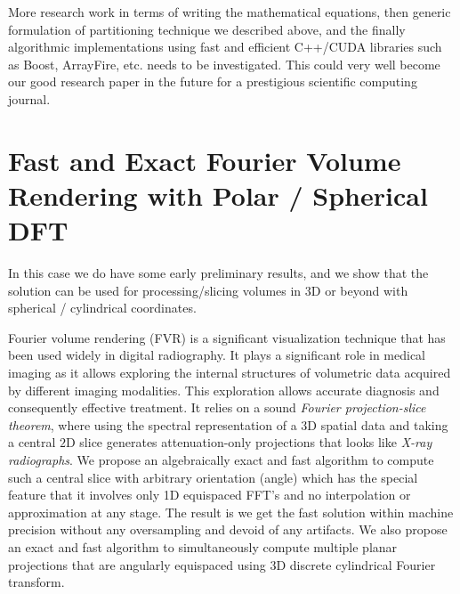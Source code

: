 \documentclass{UCF_ETD}
\begin{document}
More research work in terms of writing the mathematical equations, then generic formulation of partitioning technique we described above, and the finally algorithmic implementations using fast and efficient C++/CUDA libraries such as Boost, ArrayFire, etc. needs to be investigated. This could very well become our good research paper in the future for a prestigious scientific computing journal.

\section{Fast and Exact Fourier Volume Rendering with Polar / Spherical DFT}
In this case we do have some early preliminary results, and we show that the solution can be used for processing/slicing volumes in $3$D or beyond with spherical / cylindrical coordinates. 

Fourier volume rendering (FVR) is a significant visualization technique that has been used widely in digital radiography. It plays a significant role in medical imaging as it allows exploring the internal structures of volumetric data acquired by different imaging modalities. This exploration allows accurate diagnosis and consequently effective treatment. It relies on a sound \emph{Fourier projection-slice theorem}, where using the spectral representation of a $3$D spatial data and taking a central $2$D slice generates attenuation-only projections that looks like \emph{X-ray radiographs}. We propose an algebraically exact and fast algorithm to compute such a central slice with arbitrary orientation (angle) which has the special feature that it involves only 1D equispaced FFT's and no interpolation or approximation at any stage. The result is we get the fast solution within machine precision without any oversampling and devoid of any artifacts. We also propose an exact and fast algorithm to simultaneously compute multiple planar projections that are angularly equispaced using $3$D discrete cylindrical Fourier transform.
\end{document}
